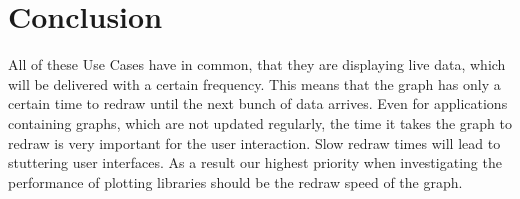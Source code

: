 \section{Conclusion}
\label{sec:usecases:metrics}

All of these Use Cases have in common, that they are displaying live data, which
will be delivered with a certain frequency. This means that the graph has only a
certain time to redraw until the next bunch of data arrives. Even for
applications containing graphs, which are not updated regularly, the time it
takes the graph to redraw is very important for the user interaction. Slow
redraw times will lead to stuttering user interfaces. As a result our highest
priority when investigating the performance of plotting libraries should be the
redraw speed of the graph.
